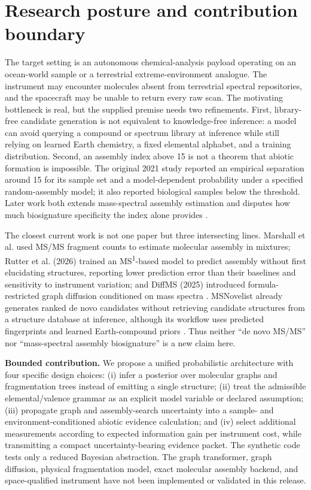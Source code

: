 \documentclass[10pt,a4paper]{article}
\begin{document}
\section{Research posture and contribution boundary}
The target setting is an autonomous chemical-analysis payload operating on an ocean-world sample or a terrestrial extreme-environment analogue. The instrument may encounter molecules absent from terrestrial spectral repositories, and the spacecraft may be unable to return every raw scan. The motivating bottleneck is real, but the supplied premise needs two refinements. First, library-free candidate generation is not equivalent to knowledge-free inference: a model can avoid querying a compound or spectrum library at inference while still relying on learned Earth chemistry, a fixed elemental alphabet, and a training distribution. Second, an assembly index above 15 is not a theorem that abiotic formation is impossible. The original 2021 study reported an empirical separation around 15 for its sample set and a model-dependent probability under a specified random-assembly model; it also reported biological samples below the threshold. Later work both extends mass-spectral assembly estimation and disputes how much biosignature specificity the index alone provides \cite{Marshall2021,Uthamacumaran2024,Rutter2026}.

The closest current work is not one paper but three intersecting lines. Marshall et al. used MS/MS fragment counts to estimate molecular assembly in mixtures; Rutter et al. (2026) trained an MS\textsuperscript{1}-based model to predict assembly without first elucidating structures, reporting lower prediction error than their baselines and sensitivity to instrument variation; and DiffMS (2025) introduced formula-restricted graph diffusion conditioned on mass spectra \cite{Marshall2021,Rutter2026,Bohde2025}. MSNovelist already generates ranked de novo candidates without retrieving candidate structures from a structure database at inference, although its workflow uses predicted fingerprints and learned Earth-compound priors \cite{Stravs2022}. Thus neither “de novo MS/MS” nor “mass-spectral assembly biosignature” is a new claim here.

\textbf{Bounded contribution.} We propose a unified probabilistic architecture with four specific design choices: (i) infer a posterior over molecular graphs and fragmentation trees instead of emitting a single structure; (ii) treat the admissible elemental/valence grammar as an explicit model variable or declared assumption; (iii) propagate graph and assembly-search uncertainty into a sample- and environment-conditioned abiotic evidence calculation; and (iv) select additional measurements according to expected information gain per instrument cost, while transmitting a compact uncertainty-bearing evidence packet. The synthetic code tests only a reduced Bayesian abstraction. The graph transformer, graph diffusion, physical fragmentation model, exact molecular assembly backend, and space-qualified instrument have not been implemented or validated in this release.
\end{document}
